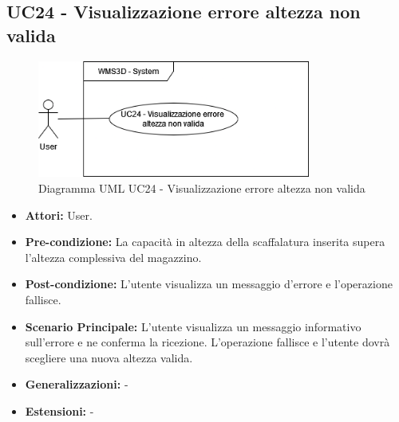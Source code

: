 \subsection{UC24 - Visualizzazione errore altezza non valida}
\begin{figure}[H]
  \centering
  \includegraphics[width=0.8\textwidth]{UC_diagrams_21-27/UC24.drawio.png}
   \caption{Diagramma UML UC24 - Visualizzazione errore altezza non valida}
\end{figure}
\begin{itemize}
    \item \textbf{Attori:} User.
    \item \textbf{Pre-condizione:}  La capacità in altezza della scaffalatura inserita supera l'altezza complessiva del magazzino.
    \item \textbf{Post-condizione:} L'utente visualizza un messaggio d'errore e l'operazione fallisce.
    \item \textbf{Scenario Principale:}  L'utente visualizza un messaggio informativo sull'errore e ne conferma la ricezione. L'operazione fallisce e l'utente dovrà scegliere una nuova altezza valida.
    \item \textbf{Generalizzazioni:} -
    \item \textbf{Estensioni:} -
\end{itemize}